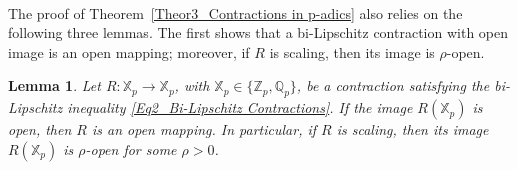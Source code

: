 \documentclass[a4paper, 12pt]{article}
\newtheorem{lemma}[theorem]{Lemma}
\theoremstyle{definition}
\begin{document}
	
	
	
	
	
	
	
	
	\paragraph{}
	
	The proof of Theorem~\ref{Theor3_Contractions in p-adics} also relies on the following three lemmas. The first shows that a bi-Lipschitz contraction with open image is an open mapping; moreover, if $ R $ is scaling, then its image is $\rho$-open.
	
	
	\begin{lemma}\label{Lem2_Open bi-Lipschitz Contractions}
		Let $R: \mathbb{X}_{p} \to \mathbb{X}_{p}$, with $\mathbb{X}_{p} \in \{\mathbb{Z}_{p}, \mathbb{Q}_{p}\}$, be a contraction satisfying the bi-Lipschitz inequality \eqref{Eq2_Bi-Lipschitz Contractions}. 
		If the image $R(\mathbb{X}_{p})$ is open, then $R$ is an open mapping. 
		In particular, if $R$ is scaling, then its image $R(\mathbb{X}_{p})$ is $\rho$-open for some $\rho > 0$.
		
	\end{lemma}
	
\end{document}
